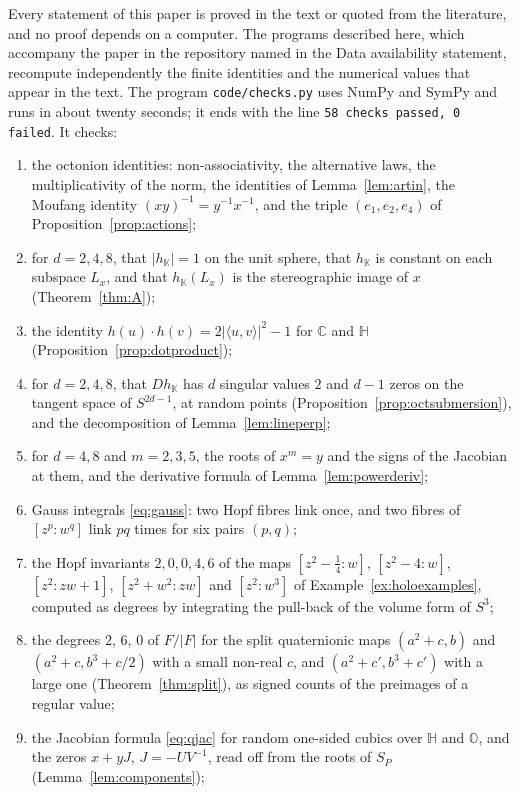 \documentclass[11pt]{amsart}
\numberwithin{equation}{section}
\theoremstyle{plain}
\theoremstyle{definition}
\theoremstyle{remark}
\newcommand{\C}{\mathbb{C}}
\newcommand{\Hq}{\mathbb{H}}
\newcommand{\Oc}{\mathbb{O}}
\newcommand{\K}{\mathbb{K}}
\begin{document}
Every statement of this paper is proved in the text or quoted from the literature, and no proof depends on a computer. The programs described here, which accompany the paper in the repository named in the Data availability statement, recompute independently the finite identities and the numerical values that appear in the text. The program \texttt{code/checks.py} uses NumPy and SymPy and runs in about twenty seconds; it ends with the line \texttt{58 checks passed, 0 failed}. It checks:
\begin{enumerate}[label=(\arabic*)]
\item the octonion identities: non-associativity, the alternative laws, the multiplicativity of the norm, the identities of Lemma~\ref{lem:artin}, the Moufang identity $(xy)^{-1}=y^{-1}x^{-1}$, and the triple $(e_1,e_2,e_4)$ of Proposition~\ref{prop:actions};
\item for $d=2,4,8$, that $|h_\K|=1$ on the unit sphere, that $h_\K$ is constant on each subspace $L_x$, and that $h_\K(L_x)$ is the stereographic image of $x$ (Theorem~\ref{thm:A});
\item the identity $h(u)\cdot h(v)=2|\langle u,v\rangle|^2-1$ for $\C$ and $\Hq$ (Proposition~\ref{prop:dotproduct});
\item for $d=2,4,8$, that $Dh_\K$ has $d$ singular values $2$ and $d-1$ zeros on the tangent space of $S^{2d-1}$, at random points (Proposition~\ref{prop:octsubmersion}), and the decomposition of Lemma~\ref{lem:lineperp};
\item for $d=4,8$ and $m=2,3,5$, the roots of $x^m=y$ and the signs of the Jacobian at them, and the derivative formula of Lemma~\ref{lem:powerderiv};
\item Gauss integrals \eqref{eq:gauss}: two Hopf fibres link once, and two fibres of $[z^p:w^q]$ link $pq$ times for six pairs $(p,q)$;
\item the Hopf invariants $2,0,0,4,6$ of the maps $[z^2-\tfrac14:w]$, $[z^2-4:w]$, $[z^2:zw+1]$, $[z^2+w^2:zw]$ and $[z^2:w^3]$ of Example~\ref{ex:holoexamples}, computed as degrees by integrating the pull-back of the volume form of $S^3$;
\item the degrees $2$, $6$, $0$ of $F/|F|$ for the split quaternionic maps $(a^2+c,b)$ and $(a^2+c,b^3+c/2)$ with a small non-real $c$, and $(a^2+c',b^3+c')$ with a large one (Theorem~\ref{thm:split}), as signed counts of the preimages of a regular value;
\item the Jacobian formula \eqref{eq:qjac} for random one-sided cubics over $\Hq$ and $\Oc$, and the zeros $x+yJ$, $J=-UV^{-1}$, read off from the roots of $S_P$ (Lemma~\ref{lem:components});

\end{enumerate}
\end{document}
